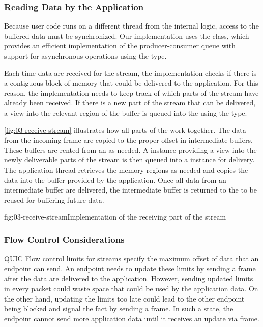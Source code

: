 \subsubsection{Reading Data by the Application}

Because user code runs on a different thread from the internal \QuicConnection{} logic, access to
the buffered data must be synchronized. Our implementation uses the \ChannelOf{} class, which
provides an efficient implementation of the producer-consumer queue with support for asynchronous
operations using the \ValueTaskOf{} type.

Each time data are received for the stream, the implementation checks if there is a contiguous block
of memory that could be delivered to the application. For this reason, the implementation needs to
keep track of which parts of the stream have already been received. If there is a new part of the
stream that can be delivered, a view into the relevant region of the buffer is queued into the
\ChannelOf{} using the \MemoryOf{\Byte{}} type.

\autoref{fig:03-receive-stream} illustrates how all parts of the \ReceiveStream{} work together. The
data from the incoming \STREAM{} frame are copied to the proper offset in intermediate buffers.
These buffers are rented from an \ArrayPoolOf{\Byte{}} as needed. A \MemoryOf{\Byte} instance
providing a view into the newly deliverable parts of the stream is then queued into a \ChannelOf{}
instance for delivery. The application thread retrieves the memory regions as needed and copies the
data into the buffer provided by the application. Once all data from an intermediate buffer are
delivered, the intermediate buffer is returned to the \ArrayPoolOf{\Byte{}} to be reused for
buffering future data.

\begin{myFigure}{fig:03-receive-stream}{Implementation of the receiving part of the stream}

  \resizebox{\linewidth}{!}{}

\end{myFigure}

\subsubsection{Flow Control Considerations}

QUIC Flow control limits for streams specify the maximum offset of data that an endpoint can send.
An endpoint needs to update these limits by sending a \MAXSTREAMDATA{} frame after the data are
delivered to the application. However, sending updated limits in every packet could waste space that
could be used by the application data. On the other hand, updating the limits too late could lead to
the other endpoint being blocked and signal the fact by sending a \STREAMDATABLOCKED{} frame. In
such a state, the endpoint cannot send more application data until it receives an update via
\MAXSTREAMDATA{} frame.

